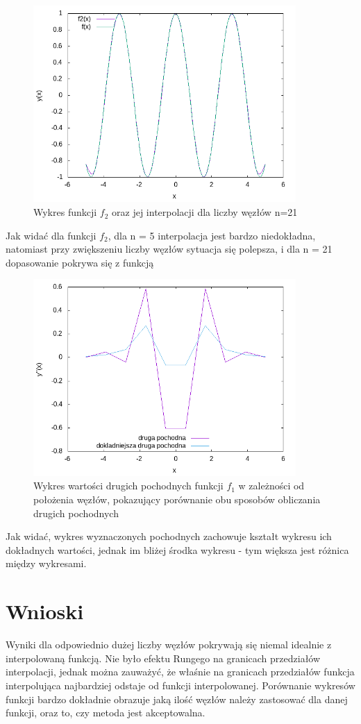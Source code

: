 \documentclass{article}
\begin{document}
\begin{figure}[h!]
\centering
\includegraphics[width=10cm]{f2_21.png}
\caption{Wykres funkcji $f_2$ oraz jej interpolacji dla liczby węzłów n=21}
\label{fig:obrazek f2_21}
\end{figure}
\newpage
Jak widać dla funkcji $f_2$, dla n = 5 interpolacja jest bardzo niedokładna, natomiast przy zwiększeniu liczby węzłów sytuacja się polepsza, i dla n = 21 dopasowanie pokrywa się z funkcją

\begin{figure}[h!]
\centering
\includegraphics[width=10cm]{pochodne.png}
\caption{Wykres wartości drugich pochodnych funkcji $f_1$ w zależności od położenia węzłów, pokazujący 
porównanie obu sposobów obliczania drugich pochodnych}
\label{fig:obrazek pochodne}
\end{figure}
\newpage
Jak widać, wykres wyznaczonych pochodnych zachowuje kształt wykresu ich dokładnych 
wartości, jednak im bliżej środka wykresu - tym większa jest różnica między wykresami.


\section{Wnioski}
Wyniki dla odpowiednio dużej liczby węzłów pokrywają się niemal idealnie z interpolowaną funkcją. Nie było  efektu Rungego na granicach przedziałów interpolacji, jednak można zauważyć, że właśnie na granicach przedziałów funkcja interpolująca najbardziej odstaje od funkcji interpolowanej. Porównanie wykresów funkcji bardzo dokładnie obrazuje jaką ilość węzłów należy zastosować dla danej funkcji, oraz to, czy metoda jest akceptowalna.
\end{document}
